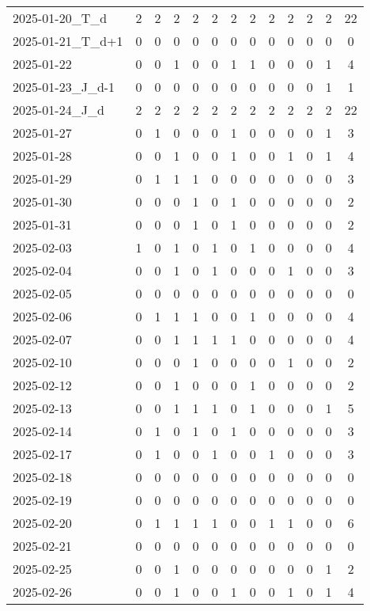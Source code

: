 \documentclass[dvipdfmx,oneside]{article}
\begin{document}
\begin{longtable}{lcccccccccccc}
2025-01-20\_T\_d & 2 & 2 & 2 & 2 & 2 & 2 & 2 & 2 & 2 & 2 & 2 & 22 \\
2025-01-21\_T\_d+1 & 0 & 0 & 0 & 0 & 0 & 0 & 0 & 0 & 0 & 0 & 0 & 0 \\
2025-01-22 & 0 & 0 & 1 & 0 & 0 & 1 & 1 & 0 & 0 & 0 & 1 & 4 \\
2025-01-23\_J\_d-1 & 0 & 0 & 0 & 0 & 0 & 0 & 0 & 0 & 0 & 0 & 1 & 1 \\
2025-01-24\_J\_d & 2 & 2 & 2 & 2 & 2 & 2 & 2 & 2 & 2 & 2 & 2 & 22 \\
2025-01-27 & 0 & 1 & 0 & 0 & 0 & 1 & 0 & 0 & 0 & 0 & 1 & 3 \\
2025-01-28 & 0 & 0 & 1 & 0 & 0 & 1 & 0 & 0 & 1 & 0 & 1 & 4 \\
2025-01-29 & 0 & 1 & 1 & 1 & 0 & 0 & 0 & 0 & 0 & 0 & 0 & 3 \\
2025-01-30 & 0 & 0 & 0 & 1 & 0 & 1 & 0 & 0 & 0 & 0 & 0 & 2 \\
2025-01-31 & 0 & 0 & 0 & 1 & 0 & 1 & 0 & 0 & 0 & 0 & 0 & 2 \\
2025-02-03 & 1 & 0 & 1 & 0 & 1 & 0 & 1 & 0 & 0 & 0 & 0 & 4 \\
2025-02-04 & 0 & 0 & 1 & 0 & 1 & 0 & 0 & 0 & 1 & 0 & 0 & 3 \\
2025-02-05 & 0 & 0 & 0 & 0 & 0 & 0 & 0 & 0 & 0 & 0 & 0 & 0 \\
2025-02-06 & 0 & 1 & 1 & 1 & 0 & 0 & 1 & 0 & 0 & 0 & 0 & 4 \\
2025-02-07 & 0 & 0 & 1 & 1 & 1 & 1 & 0 & 0 & 0 & 0 & 0 & 4 \\
2025-02-10 & 0 & 0 & 0 & 1 & 0 & 0 & 0 & 0 & 1 & 0 & 0 & 2 \\
2025-02-12 & 0 & 0 & 1 & 0 & 0 & 0 & 1 & 0 & 0 & 0 & 0 & 2 \\
2025-02-13 & 0 & 0 & 1 & 1 & 1 & 0 & 1 & 0 & 0 & 0 & 1 & 5 \\
2025-02-14 & 0 & 1 & 0 & 1 & 0 & 1 & 0 & 0 & 0 & 0 & 0 & 3 \\
2025-02-17 & 0 & 1 & 0 & 0 & 1 & 0 & 0 & 1 & 0 & 0 & 0 & 3 \\
2025-02-18 & 0 & 0 & 0 & 0 & 0 & 0 & 0 & 0 & 0 & 0 & 0 & 0 \\
2025-02-19 & 0 & 0 & 0 & 0 & 0 & 0 & 0 & 0 & 0 & 0 & 0 & 0 \\
2025-02-20 & 0 & 1 & 1 & 1 & 1 & 0 & 0 & 1 & 1 & 0 & 0 & 6 \\
2025-02-21 & 0 & 0 & 0 & 0 & 0 & 0 & 0 & 0 & 0 & 0 & 0 & 0 \\
2025-02-25 & 0 & 0 & 1 & 0 & 0 & 0 & 0 & 0 & 0 & 0 & 1 & 2 \\
2025-02-26 & 0 & 0 & 1 & 0 & 0 & 1 & 0 & 0 & 1 & 0 & 1 & 4 \\

\end{longtable}
\end{document}

